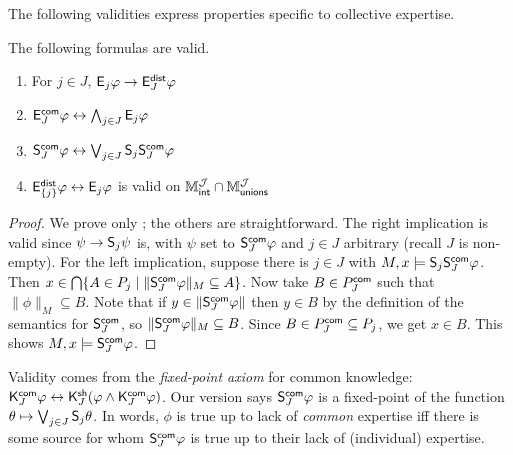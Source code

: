 The following validities express properties
specific to collective expertise.

\begin{proposition}
\label{prop_collective_validities}
The following formulas are valid.

\begin{enumerate}\small
    \item For $j \in J$, $\mathsf{E}_j\varphi \to \mathsf{E}_J^{\mathsf{dist}}\varphi$

    \item $\mathsf{E}_J^{\mathsf{com}}\varphi \leftrightarrow \bigwedge_{j \in J}{\mathsf{E}_j\varphi}$

    \item\label{item_common_exp_fp} $\mathsf{S}_J^{\mathsf{com}}\varphi \leftrightarrow \bigvee_{j \in
        J}\mathsf{S}_j\mathsf{S}_J^{\mathsf{com}}\varphi$

    \item $\mathsf{E}_{\{j\}}^{\mathsf{dist}}\varphi \leftrightarrow \mathsf{E}_j\varphi$ is valid on $\mathbb{M}_{\mathsf{int}}^{\mathcal{J}} \cap
          \mathbb{M}_{\mathsf{unions}}^{\mathcal{J}}$

    \end{enumerate}
\end{proposition}
\begin{proof}
    We prove only ; the others are straightforward.
    The right implication is valid since $\psi \to \mathsf{S}_j\psi$ is, with
    $\psi$ set to $\mathsf{S}_J^{\mathsf{com}}\varphi$ and $j \in J$ arbitrary (recall $J$ is
    non-empty).
    For the left implication, suppose there is $j \in J$ with $M, x \models
    \mathsf{S}_j\mathsf{S}_J^{\mathsf{com}}\varphi$. Then $x \in \bigcap\{A \in P_j \mid
    \|\mathsf{S}_J^{\mathsf{com}}\varphi\|_M \subseteq A\}$. Now take $B \in P_J^{\mathsf{com}}$ such
    that $\|\phi\|_M \subseteq B$. Note that if $y \in \|\mathsf{S}_J^{\mathsf{com}}\varphi\|$
    then $y \in B$ by the definition of the semantics for $\mathsf{S}_J^{\mathsf{com}}$, so
    $\|\mathsf{S}_J^{\mathsf{com}}\varphi\|_M \subseteq B$. Since $B \in P_J^{\mathsf{com}} \subseteq
    P_j$, we get $x \in B$.  This shows $M, x \models \mathsf{S}_J^{\mathsf{com}}\varphi$.
\end{proof}

Validity  comes from the
\emph{fixed-point axiom} for common knowledge: $\mathsf{K}^{\mathsf{com}}_J\varphi \leftrightarrow
\mathsf{K}^{\mathsf{sh}}_J(\varphi \land \mathsf{K}^{\mathsf{com}}_J\varphi)$. Our version says
$\mathsf{S}_J^{\mathsf{com}}\varphi$ is a fixed-point of the function $\theta \mapsto \bigvee_{j
\in J}{\mathsf{S}_j\theta}$. In words, $\phi$ is true up to lack of \emph{common}
expertise iff there is some source for whom $\mathsf{S}_J^{\mathsf{com}}\varphi$ is true up to
their lack of (individual) expertise.

